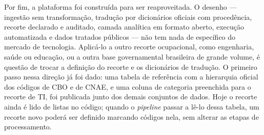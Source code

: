Por fim, a plataforma foi construída para ser reaproveitada. O desenho --- ingestão sem transformação, tradução por dicionários oficiais com procedência, recorte declarado e auditado, camada analítica em formato aberto, execução automatizada e dados tratados públicos --- não tem nada de específico do mercado de tecnologia. Aplicá-lo a outro recorte ocupacional, como engenharia, saúde ou educação, ou a outra base governamental brasileira de grande volume, é questão de trocar a definição do recorte e os dicionários de tradução. O primeiro passo nessa direção já foi dado: uma tabela de referência com a hierarquia oficial dos códigos de CBO e de CNAE, e uma coluna de categoria preenchida para o recorte de TI, foi publicada junto dos demais conjuntos de dados. Hoje o recorte ainda é lido de listas no código; quando o \textit{pipeline} passar a lê-lo dessa tabela, um recorte novo poderá ser definido marcando códigos nela, sem alterar as etapas de processamento.
